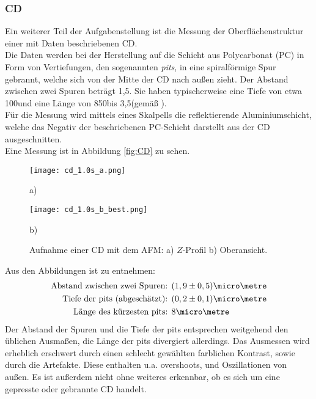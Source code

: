 \subsubsection{CD}
Ein weiterer Teil der Aufgabenstellung ist die Messung der Oberflächenstruktur einer mit Daten beschriebenen CD.\\
Die Daten werden bei der Herstellung auf die Schicht aus Polycarbonat (PC) in Form von Vertiefungen, den sogenannten \emph{pits}, in eine spiralförmige Spur gebrannt, welche sich von der Mitte der CD nach außen zieht. Der Abstand zwischen zwei Spuren beträgt 1,5\micro\metre . Sie haben typischerweise eine Tiefe von etwa 100\nano\metre und eine Länge von 850\nano\metre bis 3,5\micro\metre (gemäß \cite{lit:wiki_cd}).\\
Für die Messung wird mittels eines Skalpells die reflektierende Aluminiumschicht, welche das Negativ der beschriebenen PC-Schicht darstellt aus der CD ausgeschnitten.\\
Eine Messung ist in Abbildung \ref{fig:CD} zu sehen.
\begin{figure}[h]
	\begin{minipage}{0.45\textwidth}
		\texttt{[image: cd\_1.0s\_a.png]}
		\caption{a)}
	\end{minipage}
	\hfill
	\begin{minipage}{0.45\textwidth}
		\texttt{[image: cd\_1.0s\_b\_best.png]}
		\caption{b)}
	\end{minipage}
	\caption{Aufnahme einer CD mit dem AFM: a) $Z$-Profil b) Oberansicht.}
\end{figure}
Aus den Abbildungen ist zu entnehmen:
\begin{align*}
\text{Abstand zwischen zwei Spuren: }& (1,9\pm0,5)\micro\metre\\
\text{Tiefe der pits (abgeschätzt): }& (0,2\pm0,1)\micro\metre\\
\text{Länge des kürzesten pits: }& 8\micro\metre 
\end{align*}
Der Abstand der Spuren und die Tiefe der pits entsprechen weitgehend den üblichen Ausmaßen, die Länge der pits divergiert allerdings. Das Ausmessen wird erheblich erschwert durch einen schlecht gewählten farblichen Kontrast, sowie durch die Artefakte. Diese enthalten u.a. overshoots, und Oszillationen von außen. Es ist außerdem nicht ohne weiteres erkennbar, ob es sich um eine gepresste oder gebrannte CD handelt.
